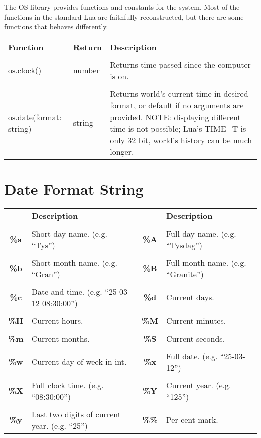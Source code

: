 The OS library provides functions and constants for the system. Most of the functions in the standard Lua are faithfully reconstructed, but there are some functions that behaves differently.

\begin{tabularx}{\textwidth}{l l X}
	\textbf{\large Function} & \textbf{\large Return} & \textbf{\large Description}
	\\ \\
	\endhead
	os.clock() & number & Returns time passed since the computer is on.
	\\ \\
	os.date(format: string) & string & Returns world's current time in desired format, or default if no arguments are provided. NOTE: displaying different time is not possible; Lua's TIME\_T is only 32 bit, world's history can be much longer.
\end{tabularx}

\section{Date Format String}

\begin{tabularx}{\textwidth}{c X c X}
	\textbf{\large } & \textbf{\large Description} & \textbf{\large } & \textbf{\large Description}
	\\ \\
	\endhead
	\textbf{\%a} & Short day name. (e.g. ``Tys'') & \textbf{\%A} & Full day name. (e.g. ``Tysdag'')
	\\ \\
	\textbf{\%b} & Short month name. (e.g. ``Gran'') & \textbf{\%B} & Full month name. (e.g. ``Granite'')
	\\ \\
	\textbf{\%c} & Date and time. (e.g. ``25-03-12 08:30:00'') & \textbf{\%d} & Current days.
	\\ \\
	\textbf{\%H} & Current hours. & \textbf{\%M} & Current minutes.
	\\ \\
	\textbf{\%m} & Current months. & \textbf{\%S} & Current seconds.
	\\ \\
	\textbf{\%w} & Current day of week in int. & \textbf{\%x} & Full date. (e.g. ``25-03-12'')
	\\ \\
	\textbf{\%X} & Full clock time. (e.g. ``08:30:00'') & \textbf{\%Y} & Current year. (e.g. ``125'')
	\\ \\
	\textbf{\%y} & Last two digits of current year. (e.g. ``25'') & \textbf{\%\%} & Per cent mark.
\end{tabularx}